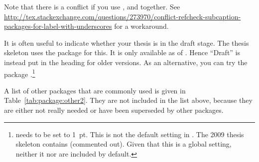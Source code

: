 Note that there is a conflict if you use ,  and  together.
See \url{http://tex.stackexchange.com/questions/273970/conflict-refcheck-subcaption-packages-for-label-with-underscores} for a workaround.

It is often useful to indicate whether your thesis is in the draft stage.
The thesis skeleton uses the package  for this.
It is only available as of .
Hence \enquote{Draft} is instead put in the heading for older versions.
As an alternative, you can try the package .\footnote{%
 needs  to be set to \SI{1}{pt}.
This is not the default setting in .
The 2009 thesis skeleton contains  (commented out).
Given that this is a global setting, neither it nor  are included by default.}

A list of other packages that are commonly used is given in
Table~\ref{tab:package:other2}. They are not
included in the list above, because they are either not really needed
or have been superseded by other packages.

